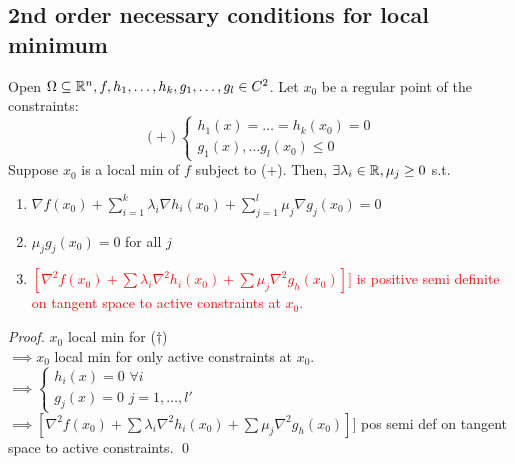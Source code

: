 \documentclass[11pt]{article}
\begin{document}
\subsection{2nd order necessary conditions for local minimum}
Open $\Omega \subseteq \mathbb{R}^n, f, h_1, \hdots, h_k, g_1, \hdots, g_l \in C^2$.
Let $x_0$ be a regular point of the constraints:
$$(+)\begin{cases}
	h_1(x) = \hdots = h_k(x_0) = 0 \\
	g_1(x), \hdots g_l(x_0) \leq 0
\end{cases}$$
Suppose $x_0$ is a local min of $f$ subject to (+).
Then, $\exists \lambda_i \in \mathbb{R}, \mu_j \geq 0$ s.t.
\begin{enumerate}
	\item $\nabla f(x_0) + \sum_{i=1}^k \lambda_i \nabla h_i(x_0) + \sum_{j=1}^l \mu_j \nabla g_j(x_0) = 0$
	\item $\mu_j g_j(x_0) = 0 $ for all $j$
	\item \textcolor{red}{$[\nabla^2 f(x_0) + \sum \lambda_i \nabla^2h_i(x_0) + \sum \mu_j \nabla^2 g_h(x_0)]]$ is positive semi definite on tangent space to active constraints at $x_0$.}
\end{enumerate}
\begin{proof}
	$x_0$ local min for ($\dag$) \\
	$\implies x_0$ local min for only active constraints at $x_0$. \\
	$\implies \begin{cases}
		h_i(x) = 0 \,\, \forall i \\
		g_j(x) = 0 \,\, j=1, \hdots, l'
	\end{cases}$ \\
	$\implies [\nabla^2 f(x_0) + \sum \lambda_i \nabla^2h_i(x_0) + \sum \mu_j \nabla^2 g_h(x_0)]]$ pos semi def on tangent space to active constraints. \qed
\end{proof}
\end{document}
